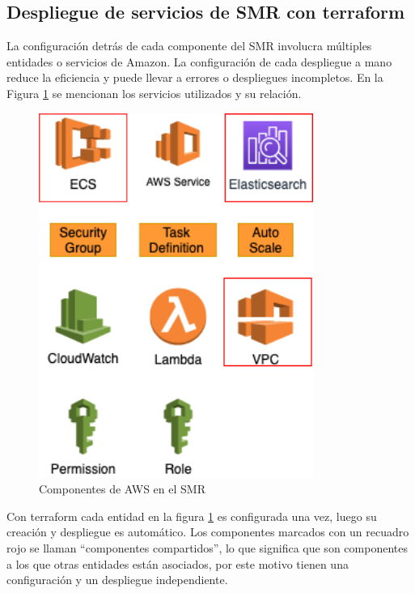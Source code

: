 \subsection{Despliegue de servicios de SMR con terraform}


La configuración detrás de cada componente del SMR involucra múltiples entidades o servicios de Amazon. La configuración de cada despliegue a mano reduce la eficiencia y puede llevar a errores o despliegues incompletos. En la Figura \ref{archcomponents} se mencionan los servicios utilizados y su relación.

\begin{figure}[H]
	\centering
	\includegraphics[width=0.80\textwidth]{bibliografia/Imagenes/Architecture Components.png}
	\caption{Componentes de AWS en el SMR}
	\label{archcomponents}
\end{figure}

Con terraform cada entidad en la figura \ref{archcomponents} es configurada una vez, luego su creación y despliegue es automático. Los componentes marcados con un recuadro rojo se llaman ``componentes compartidos'', lo que significa que son componentes a los que otras entidades están asociados, por este motivo tienen una configuración y un despliegue independiente.

